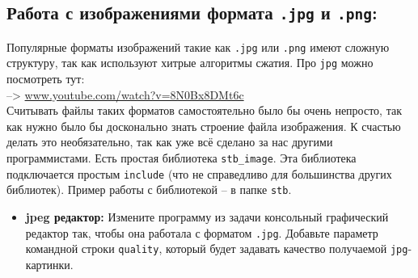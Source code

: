 \documentclass{article}
\begin{document}
\subsection*{Работа с изображениями формата \texttt{.jpg} и \texttt{.png}:}
Популярные форматы изображений такие как \texttt{.jpg} или \texttt{.png} имеют сложную структуру, так как используют хитрые алгоритмы сжатия. Про \texttt{jpg} можно посмотреть тут:\\
 --> \href{https://www.youtube.com/watch?v=8N0Bx8DMt6c}{www.youtube.com/watch?v=8N0Bx8DMt6c}\\
Считывать файлы таких форматов самостоятельно было бы очень непросто, так как нужно было бы досконально знать строение файла изображения. К счастью делать это необязательно, так как уже всё сделано за нас другими программистами. Есть простая библиотека \texttt{stb\_image}. Эта библиотека подключается простым \texttt{include} (что не справедливо для большинства других библиотек). Пример работы с библиотекой -- в папке \texttt{stb}.
\begin{itemize}
\item \textbf{jpeg редактор:} Измените программу из задачи консольный графический редактор так, чтобы она работала с форматом \texttt{.jpg}. Добавьте параметр командной строки \texttt{quality}, который будет задавать качество получаемой \texttt{jpg}-картинки. 
\end{itemize}
\end{document}

